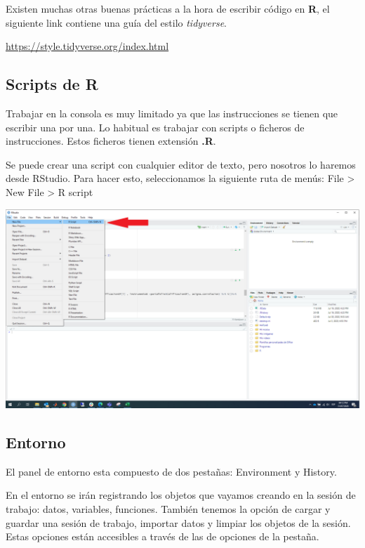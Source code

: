 \documentclass[
  12pt,
]{book}
\begin{document}
Existen muchas otras buenas prácticas a la hora de escribir código en \textbf{R}, el siguiente link contiene una guía del estilo \emph{tidyverse}.

\url{https://style.tidyverse.org/index.html}

\hypertarget{scripts-de-r}{%
\subsection{\texorpdfstring{\textbf{Scripts de R}}{Scripts de R}}\label{scripts-de-r}}

Trabajar en la consola es muy limitado ya que las instrucciones se tienen que escribir una por una. Lo habitual es trabajar con scripts o ficheros de instrucciones. Estos ficheros tienen extensión \textbf{.R}.

Se puede crear una script con cualquier editor de texto, pero nosotros lo haremos desde RStudio. Para hacer esto, seleccionamos la siguiente ruta de menús: File \textgreater{} New File \textgreater{} R script

\begin{center}\includegraphics[width=1\linewidth]{images/script} \end{center}

\hypertarget{entorno}{%
\subsection{\texorpdfstring{\textbf{Entorno}}{Entorno}}\label{entorno}}

El panel de entorno esta compuesto de dos pestañas: Environment y History.

En el entorno se irán registrando los objetos que vayamos creando en la sesión de trabajo: datos, variables, funciones. También tenemos la opción de cargar y guardar una sesión de trabajo, importar datos y limpiar los objetos de la sesión. Estas opciones están accesibles a través de las de opciones de la pestaña.
\end{document}
